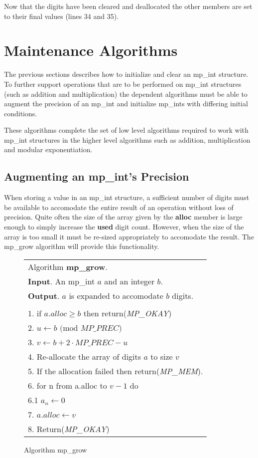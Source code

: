 \documentclass[b5paper]{book}
\begin{document}
Now that the digits have been cleared and deallocated the other members are set to their final values (lines 34 and 35).

\section{Maintenance Algorithms}

The previous sections describes how to initialize and clear an mp\_int structure.  To further support operations
that are to be performed on mp\_int structures (such as addition and multiplication) the dependent algorithms must be
able to augment the precision of an mp\_int and 
initialize mp\_ints with differing initial conditions.  

These algorithms complete the set of low level algorithms required to work with mp\_int structures in the higher level
algorithms such as addition, multiplication and modular exponentiation.

\subsection{Augmenting an mp\_int's Precision}
When storing a value in an mp\_int structure, a sufficient number of digits must be available to accomodate the entire 
result of an operation without loss of precision.  Quite often the size of the array given by the \textbf{alloc} member 
is large enough to simply increase the \textbf{used} digit count.  However, when the size of the array is too small it 
must be re-sized appropriately to accomodate the result.  The mp\_grow algorithm will provide this functionality.

\newpage\begin{figure}[here]
\begin{center}
\begin{tabular}{l}
\hline Algorithm \textbf{mp\_grow}. \\
\textbf{Input}.   An mp\_int $a$ and an integer $b$. \\
\textbf{Output}.  $a$ is expanded to accomodate $b$ digits. \\
\hline \\
1.  if $a.alloc \ge b$ then return(\textit{MP\_OKAY}) \\
2.  $u \leftarrow b\mbox{ (mod }MP\_PREC\mbox{)}$ \\
3.  $v \leftarrow b + 2 \cdot MP\_PREC - u$ \\
4.  Re-allocate the array of digits $a$ to size $v$ \\
5.  If the allocation failed then return(\textit{MP\_MEM}). \\
6.  for n from a.alloc to $v - 1$ do  \\
\hspace{+3mm}6.1  $a_n \leftarrow 0$ \\
7.  $a.alloc \leftarrow v$ \\
8.  Return(\textit{MP\_OKAY}) \\
\hline
\end{tabular}
\end{center}
\caption{Algorithm mp\_grow}
\end{figure}
\end{document}
